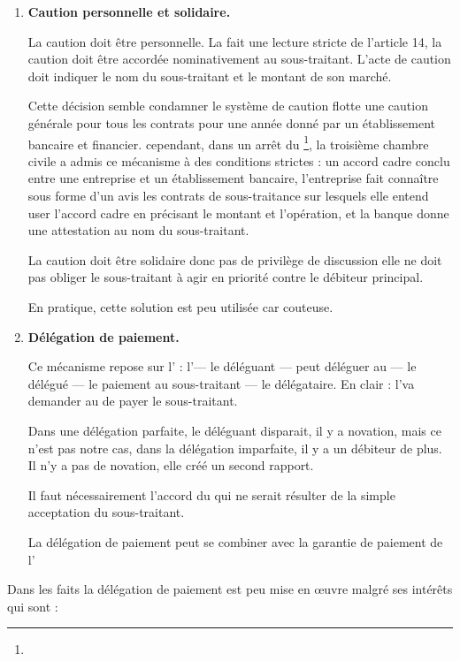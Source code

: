 					\begin{enumerate}
						\item \textbf{Caution personnelle et solidaire.}

						La caution doit être personnelle. La \CourDeCas fait une lecture stricte de l’article 14, la caution doit être accordée nominativement au sous-traitant. L’acte de caution doit indiquer le nom du sous-traitant et le montant de son marché.

						Cette décision semble condamner le système de caution flotte \cad une caution générale pour tous les contrats pour une année donné par un établissement bancaire et financier. cependant, dans un arrêt du \footnote{}, la troisième chambre civile a admis ce mécanisme à des conditions strictes : un accord cadre conclu entre une entreprise et un établissement bancaire, l’entreprise fait connaître sous forme d’un avis les contrats de sous-traitance sur lesquels elle entend user l’accord cadre en précisant le montant et l’opération, et la banque donne une attestation au nom du sous-traitant.

						La caution doit être solidaire donc pas de privilège de discussion \cad elle ne doit pas obliger le sous-traitant à agir en priorité contre le débiteur principal.

						En pratique, cette solution est peu utilisée car couteuse.

						\item 	\textbf{Délégation de paiement.}

						Ce mécanisme repose sur l' : l’\ep --- le déléguant --- peut déléguer au \Mo --- le délégué --- le paiement au sous-traitant --- le délégataire. En clair : l’\ep va demander au \Mo de payer le sous-traitant.

						Dans une délégation parfaite, le déléguant disparait, il y a novation, mais ce n’est pas notre cas, dans la délégation imparfaite, il y a un débiteur de plus. Il n’y a pas de novation, elle créé un second rapport. \aVerifier

						Il faut nécessairement l’accord du \Mo qui ne serait résulter de la simple acceptation du sous-traitant.

						La délégation de paiement peut se combiner avec la garantie de paiement de l'

						\end{enumerate}
						Dans les faits la délégation de paiement est peu mise en œuvre malgré ses intérêts qui sont :
